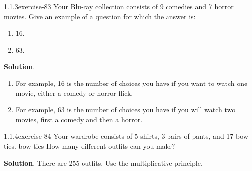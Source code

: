 \documentclass[twoside,11pt,]{book}
\numberwithin{equation}{chapter}
\begin{document}
\begin{divisionsolution}{1.1.3}{}{exercise-83}%
\hypertarget{p-1316}{}%
Your Blu-ray collection consists of 9 comedies and 7 horror movies. Give an example of a question for which the answer is:\leavevmode%
\begin{enumerate}[label=(\alph*)]
\item\hypertarget{li-988}{}\hypertarget{p-1317}{}%
16.%
\item\hypertarget{li-989}{}\hypertarget{p-1318}{}%
63.%
\end{enumerate}
%
\par\smallskip%
\noindent\textbf{Solution}.\quad%
\hypertarget{p-1319}{}%
\leavevmode%
\begin{enumerate}[label=(\alph*)]
\item\hypertarget{li-990}{}\hypertarget{p-1320}{}%
For example, 16 is the number of choices you have if you want to watch one movie, either a comedy or horror flick.%
\item\hypertarget{li-991}{}\hypertarget{p-1321}{}%
For example, 63 is the number of choices you have if you will watch two movies, first a comedy and then a horror.%
\end{enumerate}
%
\end{divisionsolution}%
\begin{divisionsolution}{1.1.4}{}{exercise-84}%
\hypertarget{p-1324}{}%
Your wardrobe consists of 5 shirts, 3 pairs of pants, and 17 bow ties. bow ties How many different outfits can you make?%
\par\smallskip%
\noindent\textbf{Solution}.\quad%
\hypertarget{p-1325}{}%
There are 255 outfits. Use the multiplicative principle.%
\end{divisionsolution}%
\end{document}
